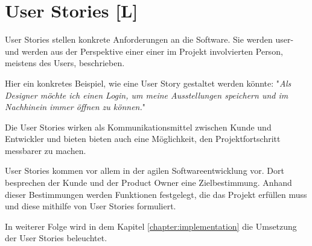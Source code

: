 \section{User Stories [L]}
\label{ch:user-stories}
User Stories stellen konkrete Anforderungen an die Software. Sie werden user- und werden aus der Perspektive einer einer im Projekt involvierten Person, meistens des Users, beschrieben. \cite{AgileVorgehensmodelle}
 
Hier ein konkretes Beispiel, wie eine User Story gestaltet werden könnte: 
"\emph{Als Designer möchte ich einen Login, um meine Ausstellungen speichern und im Nachhinein immer öffnen zu können.}"

Die User Stories wirken als Kommunikationsmittel zwischen Kunde und Entwickler und bieten bieten auch eine Möglichkeit, den Projektfortschritt messbarer zu machen. \cite{AgileVorgehensmodelle}

User Stories kommen vor allem in der agilen Softwareentwicklung vor. Dort besprechen der Kunde und der Product Owner eine Zielbestimmung. Anhand dieser Bestimmungen werden Funktionen festgelegt, die das Projekt erfüllen muss und diese mithilfe von User Stories formuliert. \cite{AgileVorgehensmodelle}

In weiterer Folge wird in dem Kapitel \ref{chapter:implementation} die Umsetzung der User Stories beleuchtet.





